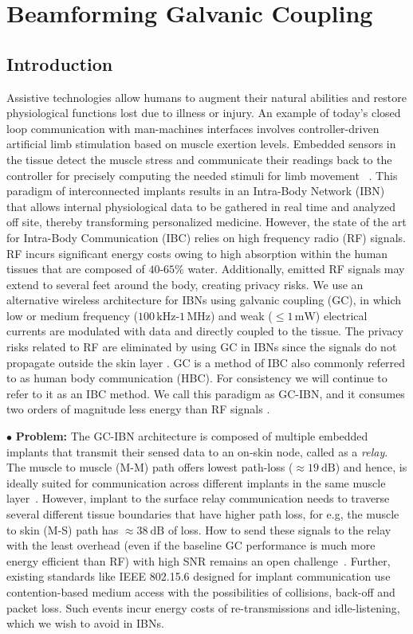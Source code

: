 \chapter{Beamforming Galvanic Coupling}
\section{Introduction} \label{sec:intro}
Assistive technologies allow humans to augment their natural abilities and restore physiological functions lost due to illness or injury. An example of today's closed loop communication with man-machines interfaces involves controller-driven artificial limb stimulation based on muscle exertion levels. Embedded sensors in the tissue detect the muscle stress and communicate their readings back to the controller for precisely computing the needed stimuli for limb movement ~\cite{cyborgs}. This paradigm of interconnected implants results in an Intra-Body Network (IBN) that allows internal physiological data to be gathered in real time and analyzed off site, thereby transforming personalized medicine.
However, the state of the art for Intra-Body Communication (IBC) relies on high frequency radio (RF) signals. RF incurs significant energy costs owing to high absorption within the human tissues that are composed of $40$-$65\%$ water. Additionally, emitted RF signals may extend to several feet around the body, creating privacy risks. We use an alternative wireless architecture for IBNs using galvanic coupling (GC), in which low or medium frequency ($100\,\mathrm{kHz}$-$1\,\mathrm{MHz}$) and weak ($\leq 1\,\mathrm{mW}$) electrical currents are modulated with data and directly coupled to the tissue. The privacy risks related to RF are eliminated by using GC in IBNs since the signals do not propagate outside the skin layer \cite{teshome}. GC is a method of IBC also commonly referred to as human body communication (HBC). For consistency we will continue to refer to it as an IBC method. We call this paradigm as GC-IBN, and it consumes two orders of magnitude less energy than RF signals \cite{tbiocas}.

  \noindent $\bullet$ \textbf{Problem:} The GC-IBN architecture is composed of multiple embedded implants that transmit their sensed data to an on-skin node, called as a \textit{relay}. The muscle to muscle (M-M) path offers lowest path-loss ($\approx 19\ \mathrm{dB}$) and hence, is ideally suited for communication across different implants in the same muscle layer~\cite{tbiocas}. However, implant to the surface relay communication needs to traverse several different tissue boundaries that have higher path loss, for e.g, the muscle to skin (M-S) path has $\approx 38\ \mathrm{dB}$ of loss. How to send these signals to the relay with the least overhead (even if the baseline  GC performance is much more energy efficient than RF) with high SNR remains an open challenge~\cite{aniso,ICNIRP}. Further, existing standards like IEEE 802.15.6 designed for implant communication use contention-based medium access with the possibilities of collisions, back-off and packet loss. Such events incur energy costs of re-transmissions and idle-listening, which we wish to avoid in IBNs.

